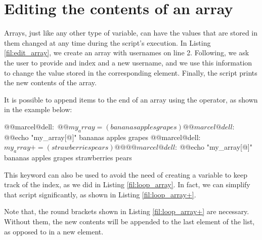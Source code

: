 \section{Editing the contents of an array}

Arrays, just like any other type of variable, can have the values that are stored in them changed at any time during the script's execution. In Listing \ref{fil:edit_array}, we create an array with usernames on line 2. Following, we ask the user to provide and index and a new username, and we use this information to change the value stored in the corresponding element. Finally, the script prints the new contents of the array.


It is possible to append items to the end of an array using the \mycommand{+=} operator, as shown in the example below:
\begin{command_line}[Bash]
@@marcel@dell:~$@@my_array=(bananas apples grapes)
@@marcel@dell:~$@@echo "{my_array[@]}"
bananas apples grapes
@@marcel@dell:~$my_array+=(strawberries pears)@@
@@marcel@dell:~$@@echo "{my_array[@]}"
bananas apples grapes strawberries pears
\end{command_line}
This keyword can also be used to avoid the need of creating a variable to keep track of the index, as we did in Listing \ref{fil:loop_array}. In fact, we can simplify that script significantly, as shown in Listing \ref{fil:loop_array+}.

Note that, the round brackets shown in Listing \ref{fil:loop_array+} are necessary. Without them, the new contents will be appended to the last element of the list, as opposed to in a new element. 

